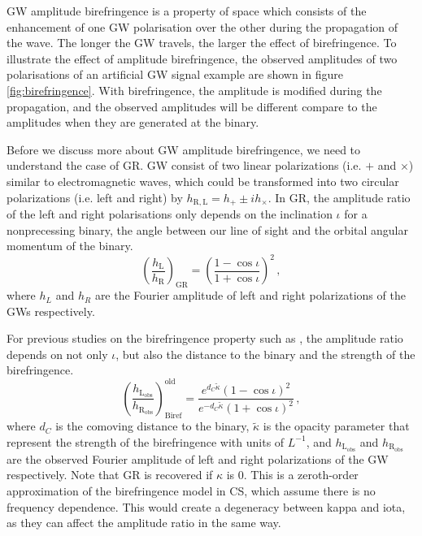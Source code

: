 \documentclass[twocolumn]{aastex631}
\begin{document}
GW amplitude birefringence is a property of space which consists of the enhancement of one GW polarisation over the other during the propagation of the wave.
The longer the GW travels, the larger the effect of birefringence.
To illustrate the effect of amplitude birefringence,
the observed amplitudes of two polarisations of an artificial GW signal example are shown in figure \ref{fig:birefringence}.
With birefringence, the amplitude is modified during the propagation,
and the observed amplitudes will be different compare to the amplitudes when they are generated at the binary.

Before we discuss more about GW amplitude birefringence, we need to understand the case of GR.
GW consist of two linear polarizations (i.e. $+$ and $\times$) similar to electromagnetic waves,
which could be transformed into two circular polarizations (i.e. left and right) by $h_{\mathrm{R}, \mathrm{L}} = h_+ \pm i h_\times$.
In GR, the amplitude ratio of the left and right polarisations only depends on the inclination $\iota$ for a nonprecessing binary,
the angle between our line of sight and the orbital angular momentum of the binary.
\begin{equation}
    \left(\frac{h_\mathrm{L}}{h_\mathrm{R}}\right)_\mathrm{GR}=\left(\frac{1-\cos\iota}{1+\cos\iota}\right)^2\,,
\end{equation}where $h_L$ and $h_R$ are the Fourier amplitude of left and right polarizations of the GWs respectively.

For previous studies on the birefringence property such as \citet{Maria_2021}, the amplitude ratio depends on not only $\iota$,
but also the distance to the binary and the strength of the birefringence.
\begin{equation}
    \left(\frac{h_\mathrm{L_{obs}}}{h_\mathrm{R_{obs}}}\right)_\mathrm{Biref}^\mathrm{old}=\frac{e^{d_C\widetilde{\kappa}}\left(1-\cos\iota\right)^2}{e^{-d_C\widetilde{\kappa}}\left(1+\cos\iota\right)^2}\,,
\end{equation}where $d_C$ is the comoving distance to the binary, $\widetilde{\kappa}$ is the opacity parameter that represent
the strength of the birefringence with units of $L^{-1}$, and $h_\mathrm{L_{obs}}$ and $h_\mathrm{R_{obs}}$ are
the observed Fourier amplitude of left and right polarizations of the GW respectively. Note that GR is recovered if $\kappa$ is $0$.
This is a zeroth-order approximation of the birefringence model in CS, which assume there is no frequency dependence.
This would create a degeneracy between kappa and iota, as they can affect the amplitude ratio in the same way.
\end{document}

